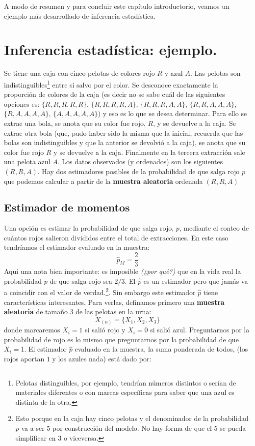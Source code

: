 \documentclass[
]{book}
\begin{document}
A modo de resumen y para concluir este capítulo introductorio, veamos un ejemplo más desarrollado de inferencia estadística.

\hypertarget{inferencia-estaduxedstica-ejemplo.}{%
\section{Inferencia estadística: ejemplo.}\label{inferencia-estaduxedstica-ejemplo.}}

Se tiene una caja con cinco pelotas de colores rojo \(R\) y azul \(A\). Las pelotas son indistinguibles\footnote{Pelotas distinguibles, por ejemplo, tendrían números distintos o serían de materiales diferentes o con marcas específicas para saber que una azul es distinta de la otra.} entre sí salvo por el color. Se desconoce exactamente la proporción de colores de la caja (es decir no se sabe cuál de las siguientes opciones es: \(\{ R, R, R, R, R\}\), \(\{ R, R, R, R, A\}\), \(\{ R, R, R, A, A\}\), \(\{ R, R, A, A, A\}\), \(\{ R, A, A, A, A\}\), \(\{ A, A, A, A, A\}\)) y eso es lo que se desea determinar. Para ello se extrae una bola, se anota que su color fue rojo, \(R\), y se devuelve a la caja. Se extrae otra bola (que, pudo haber sido la misma que la inicial, recuerda que las bolas son indistinguibles y que la anterior se devolvió a la caja), se anota que su color fue rojo \(R\) y se devuelve a la caja. Finalmente en la tercera extracción sale una pelota azul \(A\). Los datos observados (y ordenados) son los siguientes \(( R, R, A)\). Hay dos estimadores posibles de la probabilidad de que salga rojo \(p\) que podemos calcular a partir de la \textbf{muestra aleatoria} ordenada \(( R, R, A)\)

\hypertarget{estimador-de-momentos}{%
\subsection{Estimador de momentos}\label{estimador-de-momentos}}

Una opción es estimar la probabilidad de que salga rojo, \(p\), mediante el conteo de cuántos rojos salieron divididos entre el total de extracciones. En este caso tendríamos el estimador evaluado en la muestra:
\[
\hat{p}_M = \frac{2}{3}
\]
Aquí una nota bien importante: es imposible \emph{(¿por qué?)} que en la vida real la probabilidad \(p\) de que salga rojo sea \(2/3\). El \(\hat{p}\) es un estimador pero que jamás va a coincidir con el valor de verdad.\footnote{Esto porque en la caja hay cinco pelotas y el denominador de la probabilidad \(p\) va a ser \(5\) por construcción del modelo. No hay forma de que el \(5\) se pueda simplificar en \(3\) o viceversa.}. Sin embargo este estimador \(\hat{p}\) tiene características interesantes. Para verlas, definamos primero una \textbf{muestra aleatoria} de tamaño \(3\) de las pelotas en la urna:
\[
X_{(n)} = \{ X_1, X_2, X_3\}
\]
donde marcaremos \(X_i = 1\) si salió rojo y \(X_i = 0\) si salió azul. Preguntarnos por la probabilidad de rojo es lo mismo que preguntarnos por la probabilidad de que \(X_i = 1\). El estimador \(\hat{p}\) evaluado en la muestra, la suma ponderada de todos, (los rojos aportan \(1\) y los azules nada) está dado por:
\end{document}
